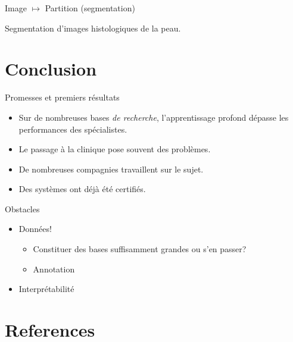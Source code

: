 \documentclass[xcolor=pdftex,dvipsnames,table,mathserif]{beamer}
\begin{document}
\begin{frame}{Image $\longmapsto$ Partition (segmentation)}

Segmentation d'images histologiques de la peau.

\end{frame}



\section{Conclusion}

\begin{frame}{Promesses et premiers résultats}

\begin{itemize}[<+->]
\item Sur de nombreuses bases \textit{de recherche}, l'apprentissage profond dépasse les performances des spécialistes.
\item Le passage à la clinique pose souvent des problèmes.
\item De nombreuses compagnies travaillent sur le sujet.
\item Des systèmes ont déjà été certifiés.
\end{itemize}


\end{frame}

\begin{frame}{Obstacles}

\begin{itemize}[<+->]
\item Données!
  \begin{itemize}
  \item Constituer des bases suffisamment grandes ou s'en passer?
  \item Annotation
  \end{itemize}
  \item Interprétabilité
\end{itemize}

\end{frame}






\section*{References}



\end{document}
